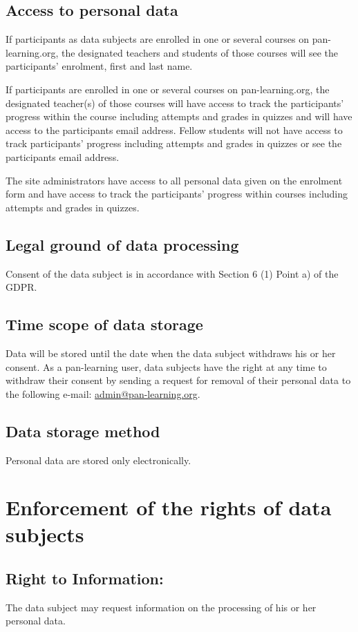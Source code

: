 \documentclass[11pt]{article}
\begin{document}
\subsection{Access to personal data}
If participants as data subjects are enrolled in one or several courses on pan-learning.org, the designated teachers and students of those courses will see the participants’ enrolment, first and last name.

If participants are enrolled in one or several courses on pan-learning.org, the designated teacher(s) of those courses will have access to track the participants’ progress within the course including attempts and grades in quizzes and will have access to the participants email address. Fellow students will not have access to track participants’ progress including attempts and grades in quizzes or see the participants email address.

The site administrators have access to all personal data given on the enrolment form and have access to track the participants’ progress within courses including attempts and grades in quizzes.

\subsection{Legal ground of data processing}
Consent of the data subject is in accordance with Section 6 (1) Point a) of the GDPR.

\subsection{Time scope of data storage}
Data will be stored until the date when the data subject withdraws his or her consent. As a pan-learning user, data subjects have the right at any time to withdraw their consent by sending a request for removal of their personal data to the following e-mail: \href{mailto:admin@pan-learning.org}{admin@pan-learning.org}.  

\subsection{Data storage method}
Personal data are stored only electronically. 

\section{Enforcement of the rights of data subjects}

\subsection{Right to Information:}
The data subject may request information on the processing of his or her personal data.
\end{document}
